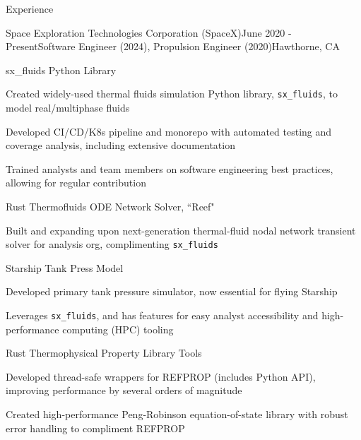 \documentclass{resume} %
\begin{document}

\begin{rSection}{Experience}

  \begin{rSubsection}{{Space Exploration Technologies Corporation (SpaceX)}}{June 2020 - Present}{Software Engineer (2024), Propulsion Engineer (2020)}{Hawthorne, CA}
  \begin{rSubsubsection}{sx\_fluids Python Library}
    \item {\small Created widely-used thermal fluids simulation Python library, \texttt{sx\_fluids}, to model real/multiphase fluids}
    \item {\small Developed CI/CD/K8s pipeline and monorepo with automated testing and coverage analysis, including extensive documentation}
    \item {\small Trained analysts and team members on software engineering best practices, allowing for regular contribution}
  \end{rSubsubsection}

  \vspace{-0.3em}

  \begin{rSubsubsection}{Rust Thermofluids ODE Network Solver, ``Reef"}
    \item {\small Built and expanding upon next-generation thermal-fluid nodal network transient solver for analysis org, complimenting \texttt{sx\_fluids}}
  \end{rSubsubsection}

  \begin{rSubsubsection}{Starship Tank Press Model}
    \item {\small Developed primary tank pressure simulator, now essential for flying Starship}
    \item {\small Leverages \texttt{sx\_fluids}, and has features for easy analyst accessibility and high-performance computing (HPC) tooling}
  \end{rSubsubsection}

  \begin{rSubsubsection}{Rust Thermophysical Property Library Tools}
    \item {\small Developed thread-safe wrappers for REFPROP (includes Python API), improving performance by several orders of magnitude}
    \item {\small Created high-performance Peng-Robinson equation-of-state library with robust error handling to compliment REFPROP}
  \end{rSubsubsection}


\end{rSubsection}
\end{rSection}
\end{document}

